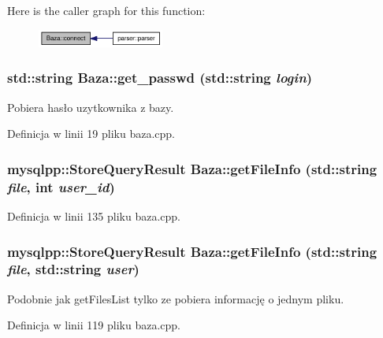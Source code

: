 Here is the caller graph for this function:\nopagebreak
\begin{figure}[H]
\begin{center}
\leavevmode
\includegraphics[width=118pt]{a00001_bef61cc396e46d347a47c75e9ef8dfde_icgraph}
\end{center}
\end{figure}
\hypertarget{a00001_a09b37e4665bd7b2f2b8b54f8120f5be}{
\subsubsection[{get\_\-passwd}]{\setlength{\rightskip}{0pt plus 5cm}std::string Baza::get\_\-passwd (std::string {\em login})}}
\label{a00001_a09b37e4665bd7b2f2b8b54f8120f5be}


Pobiera hasło uzytkownika z bazy. 



Definicja w linii 19 pliku baza.cpp.\hypertarget{a00001_1d1cfca062ab3117b2b97281df012823}{
\subsubsection[{getFileInfo}]{\setlength{\rightskip}{0pt plus 5cm}mysqlpp::StoreQueryResult Baza::getFileInfo (std::string {\em file}, \/  int {\em user\_\-id})}}
\label{a00001_1d1cfca062ab3117b2b97281df012823}




Definicja w linii 135 pliku baza.cpp.\hypertarget{a00001_e4a033a65cb585aa91c15fd8b8fde764}{
\subsubsection[{getFileInfo}]{\setlength{\rightskip}{0pt plus 5cm}mysqlpp::StoreQueryResult Baza::getFileInfo (std::string {\em file}, \/  std::string {\em user})}}
\label{a00001_e4a033a65cb585aa91c15fd8b8fde764}


Podobnie jak getFilesList tylko ze pobiera informację o jednym pliku. 



Definicja w linii 119 pliku baza.cpp.

